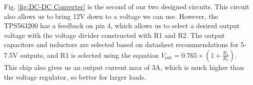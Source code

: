 Fig. \ref{fig:DC-DC Converter} is the second of our two designed circuits. This circuit also allows us to bring 12V down to a voltage we can use. However, the TPS563200 has a feedback on pin 4, which allows us to select a desired output voltage with the voltage divider constructed with R1 and R2. The output capacitors and inductors are selected based on datasheet recommendations for 5-7.5V outputs, and R1 is selected using the equation $V_{\text{out}} = 0.765 \times \left(1 + \frac{R_1}{R_2}\right)$. This chip also gives us an output current max of 3A, which is much higher than the voltage regulator, so better for larger loads.